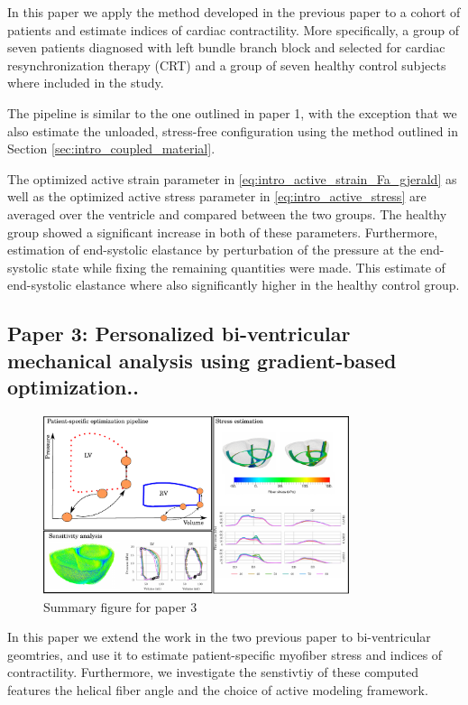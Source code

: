 In this paper we apply the method developed in the previous paper to a
cohort of patients and estimate indices of cardiac contractility. More
specifically, a group of seven patients diagnosed with left bundle branch block and
selected for cardiac resynchronization therapy (CRT) and a group of
seven healthy control subjects where included in the study.

The pipeline is similar to the one outlined in paper 1, with the
exception that we also estimate the unloaded, stress-free
configuration using the method outlined in Section
\ref{sec:intro_coupled_material}. 

The optimized active strain parameter in
\eqref{eq:intro_active_strain_Fa_gjerald} as well as the optimized
active stress parameter in \eqref{eq:intro_active_stress} are averaged
over the ventricle and compared between the two groups. The healthy
group showed a significant increase in both of these
parameters. Furthermore, estimation of end-systolic elastance by
perturbation of the pressure at the end-systolic state while fixing
the remaining quantities were made. This estimate of end-systolic
elastance where also significantly higher in the healthy control
group. 


\subsection{Paper 3: Personalized bi-ventricular mechanical analysis
  using gradient-based optimization..}

\begin{figure}[htbp]
  \centering
    \includegraphics[width=0.8\textwidth]{chapters/introduction/figures/paper3}
\caption{Summary figure for paper 3}
\label{fig:paper3}
\end{figure}

In this paper we extend the work in the two previous paper to
bi-ventricular geomtries, and use it to estimate patient-specific
myofiber stress and indices of contractility. Furthermore, we investigate
the senstivtiy of these computed features the helical fiber angle and
the choice of active modeling framework.

